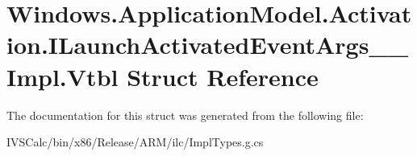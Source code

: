 \hypertarget{struct_windows_1_1_application_model_1_1_activation_1_1_i_launch_activated_event_args_____impl_1_1_vtbl}{}\section{Windows.\+Application\+Model.\+Activation.\+I\+Launch\+Activated\+Event\+Args\+\_\+\+\_\+\+Impl.\+Vtbl Struct Reference}
\label{struct_windows_1_1_application_model_1_1_activation_1_1_i_launch_activated_event_args_____impl_1_1_vtbl}


The documentation for this struct was generated from the following file\+:\begin{DoxyCompactItemize}
\item 
I\+V\+S\+Calc/bin/x86/\+Release/\+A\+R\+M/ilc/Impl\+Types.\+g.\+cs\end{DoxyCompactItemize}
